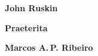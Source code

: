 \textbf{John Ruskin} \lipsum[1]

\textbf{Praeterita} \lipsum[2] 

\textbf{Marcos A.\,P. Ribeiro} \lipsum[3]





